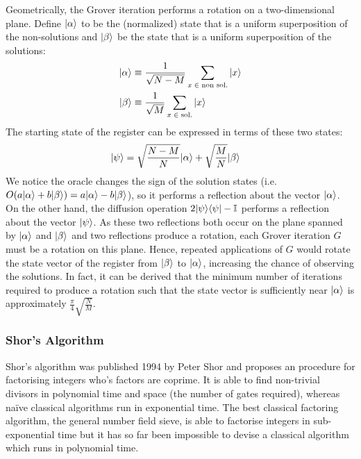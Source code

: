 \documentclass[bibliography=totocnumbered, 10pt]{article}
\theoremstyle{NoticeStyle}
\begin{document}
\begin{itemize}
Geometrically, the Grover iteration performs a rotation on a two-dimensional plane. Define ${\left\vert{\alpha}\right\rangle}$ to be the (normalized) state that is a uniform superposition of the non-solutions and ${\left\vert{\beta}\right\rangle}$ be the state that is a uniform superposition of the solutions:
\begin{align}
	{\left\vert{\alpha}\right\rangle} &\equiv \frac{1}{\sqrt{N-M}} \sum_{x \; \in \;\textrm{non sol.}} {\left\vert{x}\right\rangle}\\
	{\left\vert{\beta}\right\rangle} &\equiv \frac{1}{\sqrt{M}} \sum_{x \; \in \; \textrm{sol.}} {\left\vert{x}\right\rangle}
\end{align}
The starting state of the register can be expressed in terms of these two states:
\begin{align}
	{\left\vert{\psi}\right\rangle} &= \sqrt{\frac{N-M}{N}}{\left\vert{\alpha}\right\rangle} +\sqrt{\frac{M}{N}}{\left\vert{\beta}\right\rangle}
\end{align}
We notice the oracle changes the sign of the solution states (i.e. $O(a{\left\vert{\alpha}\right\rangle} + b{\left\vert{\beta}\right\rangle}) = a{\left\vert{\alpha}\right\rangle} - b{\left\vert{\beta}\right\rangle}$), so it performs a reflection about the vector ${\left\vert{\alpha}\right\rangle}$. On the other hand, the diffusion operation $2{\left\vert{\psi}\right\rangle}{\left\langle{\psi}\right\vert} - \mathbb{I}$ performs a reflection about the vector ${\left\vert{\psi}\right\rangle}$. As these two reflections both occur on the plane spanned by ${\left\vert{\alpha}\right\rangle}$ and ${\left\vert{\beta}\right\rangle}$ and two reflections produce a rotation, each Grover iteration $G$ must be a rotation on this plane. Hence, repeated applications of $G$ would rotate the state vector of the register from ${\left\vert{\beta}\right\rangle}$ to ${\left\vert{\alpha}\right\rangle}$, increasing the chance of observing the solutions. In fact, it can be derived that the minimum number of iterations required to produce a rotation such that the state vector is sufficiently near ${\left\vert{\alpha}\right\rangle}$ is approximately $\frac{\pi}{4} \sqrt{\frac{N}{M}}$. 


\end{itemize}


\subsubsection{Shor's Algorithm}
Shor's algorithm was published 1994 by Peter Shor and proposes an procedure for factorising integers who's factors are coprime. It is able to find non-trivial divisors in polynomial time and space (the number of gates required), whereas na\"ive classical algorithms run in exponential time. The best classical factoring algorithm, the general number field sieve, is able to factorise integers in sub-exponential time but it has so far been impossible to devise a classical algorithm which runs in polynomial time. 
\end{document}
